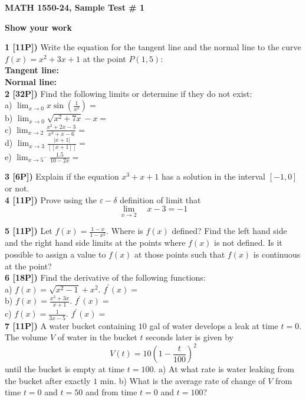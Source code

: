 \documentclass[12pt]{article}
\begin{document}

\centerline{\bf MATH 1550-24, Sample Test \# 1}%
\centerline{\bf Show your work}

{\bf 1 [11P])}  Write the equation for the tangent line and the normal line
to the curve
$\displaystyle{f(x) = x^2+3x + 1}$ at the
point $\displaystyle{P(1,5)}$:
\\ %
{\bf Tangent line: }
\\ %
{\bf Normal line: }
\\ %
{\bf 2 [32P])}  Find the following limits or determine if they do not exist:
\\
a) $\displaystyle{\lim_{x\to 0}x\sin \left(\frac{1}{x^2}\right)=}$
\\ %
b) $\displaystyle{\lim_{x\to 0} \sqrt{x^2+7x}-x =}$
\\
c) $\displaystyle{\lim_{x\to 2}\frac{x^2+2x-3}{x^2+x-6}=}$
\\ %
d) $\displaystyle{\lim_{x\to 3}\frac{\vert x+1 \vert}{[[x+1]]}=}$
\\
e) $\displaystyle{\lim_{x\to 5^-}\frac{1.5}{10-2x}=}$ 

{\bf 3 [6P])}  Explain if the equation $\displaystyle{x^3+x + 1}$ has a solution in the
interval $[-1,0]$ or not.
\\ %
{\bf 4 [11P])} Prove using the $\varepsilon-\delta$ definition of limit
that
$$
\lim_{x\rightarrow 2}\quad x-3 =-1
$$


{\bf 5 [11P])}  Let $\displaystyle{f(x) = \frac{1-x}{1-x^2}}$. Where
is $f(x)$ defined?  Find the left hand side and the right hand side limits at the
points where $f(x)$ is not defined. Is it possible to assign a value to $f(x)$ at
those points such that $f(x)$ is continuous at the point?
\\ %
{\bf 6 [18P])} Find the derivative of the following functions:
\\ %
a) $\displaystyle{f(x) = \sqrt{x^2-1} + x^2} $. $\displaystyle{f^\prime(x) = }$
\\ %
b) $\displaystyle{f(x) = \frac{x^3 + 3x}{x+1}}$.
$\displaystyle{f^\prime(x) = }$
\\ %
c) $\displaystyle{f(x) = \frac{1}{3x-5}}$. $\displaystyle{f^\prime(x) = }$
\\ %
{\bf 7 [11P])} A water bucket containing $10$ gal of water
develops a leak at time
$t=0$. The volume $V$ of water
in the bucket $t$ seconds later is given by
\[ V(t) = 10\left(1 - \frac{t}{100}\right)^2\]
until the bucket is empty at time $t=100$.
a) At what rate is water leaking from the bucket after
exactly $1$ min.
b) What is the average rate of change of $V$ from time $t=0$
and $t=50$ and from time $t=0$ and $t=100$?
\end{document}
